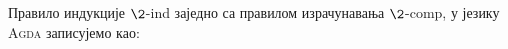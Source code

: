 Правило индукције $\2$-ind заједно са правилом израчунавања $\2$-comp, у језику \textsc{Agda} записујемо као:
\begin{code}%
\>[0]%
\>[2261I]\AgdaSymbol{:}\AgdaSpace{}%
\AgdaSymbol{(}\AgdaSpace{}%
\AgdaSymbol{:}\AgdaSpace{}%
\AgdaSpace{}%
\AgdaSpace{}%
\AgdaSpace{}%
\AgdaSpace{}%
\AgdaSymbol{)}\<%
\\
\>[.][@{}l@{}]\<[2261I]%
\>[12]\AgdaSpace{}%
\AgdaSymbol{(}\AgdaSpace{}%
\AgdaSymbol{)}\<%
\\
%
\>[12]\AgdaSpace{}%
\AgdaSymbol{(}\AgdaSpace{}%
\AgdaSymbol{)}\<%
\\
%
\>[12]\AgdaSpace{}%
\AgdaSymbol{(}\AgdaSpace{}%
\AgdaSymbol{:}\AgdaSpace{}%
\AgdaSymbol{)}\AgdaSpace{}%
\AgdaSpace{}%
\AgdaSymbol{(}\AgdaSpace{}%
\AgdaSymbol{)}\<%
\\
\>[0]\AgdaSpace{}%
\AgdaSpace{}%
\AgdaSpace{}%
\AgdaSpace{}%
%
\>[26]\AgdaSymbol{=}\AgdaSpace{}%
\<%
\\
\>[0]\AgdaSpace{}%
\AgdaSpace{}%
\AgdaSpace{}%
\AgdaSpace{}%
\AgdaSpace{}%
\AgdaSymbol{=}\AgdaSpace{}%
\<%
\end{code}

